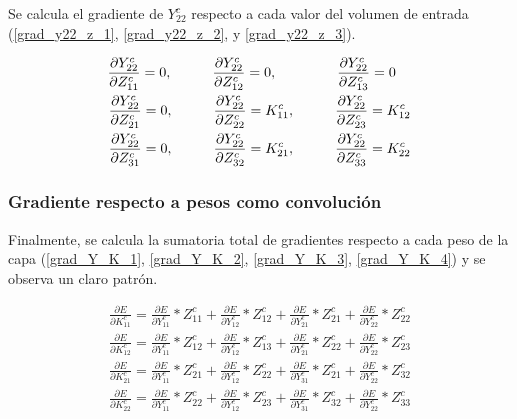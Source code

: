 Se calcula el gradiente de $Y^c_{22}$ respecto a cada valor del volumen de entrada (\ref{grad_y22_z_1}, \ref{grad_y22_z_2}, y \ref{grad_y22_z_3}).

\begin{gather}
	\frac{\partial Y^c_{22}}{\partial Z^c_{11}} = 0, \hspace{10mm} \frac{\partial Y^c_{22}}{\partial Z^c_{12}} = 0, \hspace{15mm} \frac{\partial Y^c_{22}}{\partial Z^c_{13}} = 0 \hspace{4mm} \label{grad_y22_z_1} \\
	\frac{\partial Y^c_{22}}{\partial Z^c_{21}} = 0, \hspace{10mm} \frac{\partial Y^c_{22}}{\partial Z^c_{22}} = K^c_{11}, \hspace{10mm} \frac{\partial Y^c_{22}}{\partial Z^c_{23}} = K^c_{12} \label{grad_y22_z_2} \\
	\frac{\partial Y^c_{22}}{\partial Z^c_{31}} = 0, \hspace{10mm} \frac{\partial Y^c_{22}}{\partial Z^c_{32}} = K^c_{21}, \hspace{10mm} \frac{\partial Y^c_{22}}{\partial Z^c_{33}} = K^c_{22} \label{grad_y22_z_3}
\end{gather}

\subsubsection{Gradiente respecto a pesos como convolución}

Finalmente, se calcula la sumatoria total de gradientes respecto a cada peso de la capa (\ref{grad_Y_K_1}, \ref{grad_Y_K_2}, \ref{grad_Y_K_3}, \ref{grad_Y_K_4}) y se observa un claro patrón.

\begin{gather}
	\frac{\partial E}{\partial K^c_{11}} = \frac{\partial E}{\partial Y^c_{11}} * Z^c_{11} + \frac{\partial E}{\partial Y^c_{12}} * Z^c_{12} + \frac{\partial E}{\partial Y^c_{21}} * Z^c_{21} + \frac{\partial E}{\partial Y^c_{22}} * Z^c_{22} \label{grad_Y_K_1} \\
	\frac{\partial E}{\partial K^c_{12}} = \frac{\partial E}{\partial Y^c_{11}} * Z^c_{12} + \frac{\partial E}{\partial Y^c_{12}} * Z^c_{13} + \frac{\partial E}{\partial Y^c_{21}} * Z^c_{22} + \frac{\partial E}{\partial Y^c_{22}} * Z^c_{23} \label{grad_Y_K_2} \\	
	\frac{\partial E}{\partial K^c_{21}} = \frac{\partial E}{\partial Y^c_{11}} * Z^c_{21} + \frac{\partial E}{\partial Y^c_{12}} * Z^c_{22} + \frac{\partial E}{\partial Y^c_{31}} * Z^c_{21} + \frac{\partial E}{\partial Y^c_{22}} * Z^c_{32} \label{grad_Y_K_3} \\
	\frac{\partial E}{\partial K^c_{22}} = \frac{\partial E}{\partial Y^c_{11}} * Z^c_{22} + \frac{\partial E}{\partial Y^c_{12}} * Z^c_{23} + \frac{\partial E}{\partial Y^c_{31}} * Z^c_{32} + \frac{\partial E}{\partial Y^c_{22}} * Z^c_{33} \label{grad_Y_K_4}
\end{gather}

